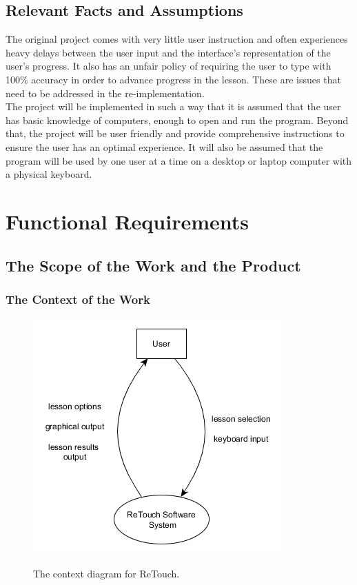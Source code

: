 \documentclass[12pt, titlepage]{article}
\begin{document}
\subsection{Relevant Facts and Assumptions}
\indent \indent The original project comes with very little user instruction and often experiences heavy delays between the user input and the interface's representation of the user's progress. It also has an unfair policy of requiring the user to type with 100\% accuracy in order to advance progress in the lesson. These are issues that need to be addressed in the re-implementation.
\\
\indent The project will be implemented in such a way that it is assumed that the user has basic knowledge of computers, enough to open and run the program. Beyond that, the project will be user friendly and provide comprehensive instructions to ensure the user has an optimal experience. It will also be assumed that the program will be used by one user at a time on a desktop or laptop computer with a physical keyboard.

\section{Functional Requirements}

\subsection{The Scope of the Work and the Product}

\subsubsection{The Context of the Work}

\begin{figure}[h!]
	\includegraphics[scale=0.75]{ContextDiagram.jpg}
	\centering
	\label{figure:1}	
	\caption{The context diagram for ReTouch.}
\end{figure}
\end{document}
